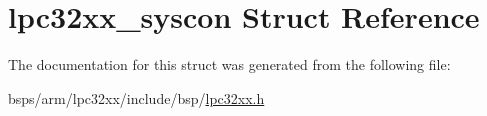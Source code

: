 \hypertarget{structlpc32xx__syscon}{}\section{lpc32xx\+\_\+syscon Struct Reference}
\label{structlpc32xx__syscon}


The documentation for this struct was generated from the following file\+:\begin{DoxyCompactItemize}
\item 
bsps/arm/lpc32xx/include/bsp/\mbox{\hyperlink{lpc32xx_8h}{lpc32xx.\+h}}\end{DoxyCompactItemize}
